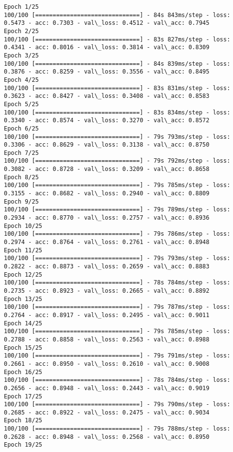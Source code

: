 \documentclass[11pt]{article}
\begin{document}
    \begin{Verbatim}[commandchars=\\\{\}]
Epoch 1/25
100/100 [==============================] - 84s 843ms/step - loss: 0.5473 - acc: 0.7303 - val\_loss: 0.4512 - val\_acc: 0.7945
Epoch 2/25
100/100 [==============================] - 83s 827ms/step - loss: 0.4341 - acc: 0.8016 - val\_loss: 0.3814 - val\_acc: 0.8309
Epoch 3/25
100/100 [==============================] - 84s 839ms/step - loss: 0.3876 - acc: 0.8259 - val\_loss: 0.3556 - val\_acc: 0.8495
Epoch 4/25
100/100 [==============================] - 83s 831ms/step - loss: 0.3623 - acc: 0.8427 - val\_loss: 0.3408 - val\_acc: 0.8583
Epoch 5/25
100/100 [==============================] - 83s 834ms/step - loss: 0.3340 - acc: 0.8574 - val\_loss: 0.3270 - val\_acc: 0.8572
Epoch 6/25
100/100 [==============================] - 79s 793ms/step - loss: 0.3306 - acc: 0.8629 - val\_loss: 0.3138 - val\_acc: 0.8750
Epoch 7/25
100/100 [==============================] - 79s 792ms/step - loss: 0.3082 - acc: 0.8728 - val\_loss: 0.3209 - val\_acc: 0.8658
Epoch 8/25
100/100 [==============================] - 79s 785ms/step - loss: 0.3155 - acc: 0.8682 - val\_loss: 0.2940 - val\_acc: 0.8809
Epoch 9/25
100/100 [==============================] - 79s 789ms/step - loss: 0.2934 - acc: 0.8770 - val\_loss: 0.2757 - val\_acc: 0.8936
Epoch 10/25
100/100 [==============================] - 79s 786ms/step - loss: 0.2974 - acc: 0.8764 - val\_loss: 0.2761 - val\_acc: 0.8948
Epoch 11/25
100/100 [==============================] - 79s 793ms/step - loss: 0.2822 - acc: 0.8873 - val\_loss: 0.2659 - val\_acc: 0.8883
Epoch 12/25
100/100 [==============================] - 78s 784ms/step - loss: 0.2735 - acc: 0.8923 - val\_loss: 0.2665 - val\_acc: 0.8892
Epoch 13/25
100/100 [==============================] - 79s 787ms/step - loss: 0.2764 - acc: 0.8917 - val\_loss: 0.2495 - val\_acc: 0.9011
Epoch 14/25
100/100 [==============================] - 79s 785ms/step - loss: 0.2788 - acc: 0.8858 - val\_loss: 0.2563 - val\_acc: 0.8988
Epoch 15/25
100/100 [==============================] - 79s 791ms/step - loss: 0.2661 - acc: 0.8950 - val\_loss: 0.2610 - val\_acc: 0.9008
Epoch 16/25
100/100 [==============================] - 78s 784ms/step - loss: 0.2656 - acc: 0.8948 - val\_loss: 0.2443 - val\_acc: 0.9019
Epoch 17/25
100/100 [==============================] - 79s 790ms/step - loss: 0.2685 - acc: 0.8922 - val\_loss: 0.2475 - val\_acc: 0.9034
Epoch 18/25
100/100 [==============================] - 79s 788ms/step - loss: 0.2628 - acc: 0.8948 - val\_loss: 0.2568 - val\_acc: 0.8950
Epoch 19/25

\end{Verbatim}
\end{document}
